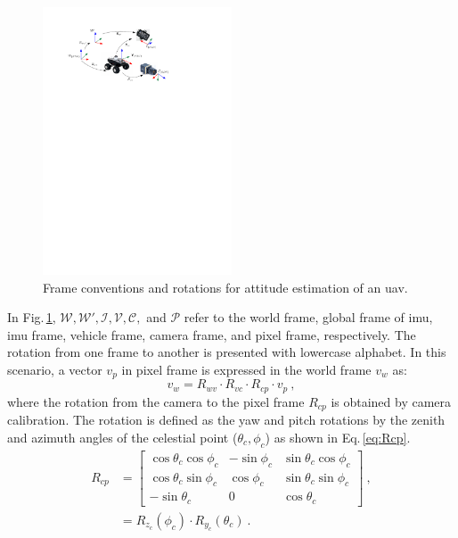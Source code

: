 \begin{figure}[h]
  \centering
  \includegraphics[width=0.5\textwidth]{./content/intro/figures/conventions.pdf}
  \caption{Frame conventions and rotations for attitude estimation of an
    \gls{uav}.}
  \label{fig:rotation}
\end{figure}
In Fig.\,\ref{fig:rotation}, $\mathcal{W}, \mathcal{W'}, \mathcal{I},
\mathcal{V}, \mathcal{C},$ and $\mathcal{P}$ refer to the world frame, global
frame of \gls{imu}, \gls{imu} frame, vehicle frame, camera frame, and pixel
frame, respectively. The rotation from one frame to another is presented
with lowercase alphabet.
In this scenario, a vector $v_{p}$ in pixel frame is expressed in the world
frame $v_{w}$ as: 
\begin{equation}
  \label{eq:vinW}
  v_{w} = R_{wv} \cdot R_{vc} \cdot R_{cp} \cdot v_{p} \ , 
\end{equation}
\noindent where the rotation from the camera to the pixel frame $R_{cp}$ is
obtained by camera calibration. The rotation is
defined as the yaw and pitch rotations by the zenith and azimuth angles of the
celestial point ($\theta_c, \phi_c$) as shown in Eq.\,\eqref{eq:Rcp}.
\begin{equation}
  \label{eq:Rcp}
  \begin{split}
  R_{cp}  & =
  \begin{bmatrix}
    \cos\theta_{c}\cos\phi_{c} & -\sin\phi_{c} & \sin\theta_{c}\cos\phi_{c}\\
    \cos\theta_{c}\sin\phi_{c} & \cos\phi_{c} & \sin\theta_{c}\sin\phi_{c}\\
    -\sin\theta_{c} & 0 & \cos\theta_{c}
  \end{bmatrix} \ ,
  \\
  & = R_{z_{c}}(\phi_{c})\cdot R_{y_{c}}(\theta_{c}) \ .
  \end{split}
\end{equation}

